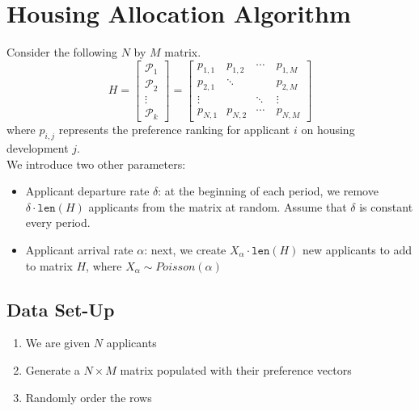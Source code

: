 \documentclass[11pt]{article}
\begin{document}
\section{Housing Allocation Algorithm}
Consider the following $N$ by $M$ matrix. 
\[H =
\begin{bmatrix}
    \mathcal{P}_1 \\
    \mathcal{P}_2 \\
    \vdots \\
    \mathcal{P}_k
\end{bmatrix}
=
\begin{bmatrix}
    p_{1,1} & p_{1,2} & \cdots & p_{1,M} \\
    p_{2,1} & \ddots & \quad & p_{2,M} \\
    \vdots & \quad & \ddots & \vdots \\
    p_{N,1} & p_{N,2} & \cdots & p_{N,M} 
\end{bmatrix}\]
where $p_{i,j}$ represents the preference ranking for applicant $i$ on housing development $j$. \\
\newline
We introduce two other parameters:
\begin{itemize}
    \item Applicant departure rate $\delta$: at the beginning of each period, we remove $\delta \cdot \texttt{len}(H)$ applicants from the matrix at random. Assume that $\delta$ is constant every period.
    \item Applicant arrival rate $\alpha$: next, we create $X_\alpha \cdot \texttt{len}(H)$ new applicants to add to matrix $H$, where $X_\alpha \sim Poisson(\alpha)$
\end{itemize}
\subsection{Data Set-Up}
\begin{enumerate}
    \item We are given $N$ applicants
    \item Generate a $N \times M$ matrix populated with their preference vectors
    \item Randomly order the rows
\end{enumerate}
\end{document}
